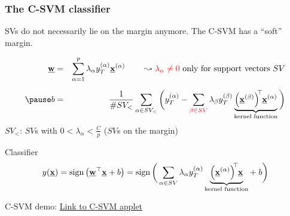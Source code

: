 \begin{frame}\frametitle{The C-SVM classifier}

SVs do not necessarily lie on the margin anymore. The C-SVM has a ``soft'' margin.

\slidesonly{\vspace{-3mm}}

	\begin{eqnarray*}
		\vec{w} &=& \sum\limits_{\alpha = 1}^p \lambda_\alpha y_T^{(\alpha)}
			\vec{x}^{(\alpha)} \qquad
		\leadsto {\color{red}\lambda_\alpha \neq 0} \text{ only for support vectors }SV\\[2mm]
		\pause
		b &=& \frac{1}{\# SV_<} \sum\limits_{\alpha \in SV_<} \bigg( y_T^{(\alpha)}
			- \sum\limits_{\color{red}\beta \in SV} \lambda_\beta y_T^{(\beta)} 
			\underbrace{ \Big( \vec{x}^{(\beta)} \Big)^{\kern-0.6ex\top} 
				\kern-0.2ex\vec{x}^{(\alpha)}}_{\text{kernel function}}
			\bigg)
	\end{eqnarray*}
	\vspace{2mm}
	$SV_<$: $SV$s with $0 < \lambda_\alpha < \frac{C}{p}$ 
	($SV$s on the margin) 
	
	\pause

	\begin{block}{Classifier}
	\begin{equation*}
		y(\underline{\mathbf{x}}) = \operatorname{sign} \big( \underline{\mathbf{w}}^\top \underline{\mathbf{x}} + b \big) 
		= \operatorname{sign} \bigg( \sum\limits_{\alpha \in SV} \lambda_\alpha y_T^{(\alpha)} 
			\underbrace{ \Big( \underline{\mathbf{x}}^{(\alpha)} \Big)^{\kern-0.6ex\top} 
				\kern-0.2ex \underline{\mathbf{x}}}_{
				\text{kernel function}} + \;b
			\bigg)
	\end{equation*}
	\end{block}
\end{frame}

\begin{frame}
C-SVM demo: \href{https://cs.stanford.edu/people/karpathy/svmjs/demo/}{Link to C-SVM applet}
\end{frame}
